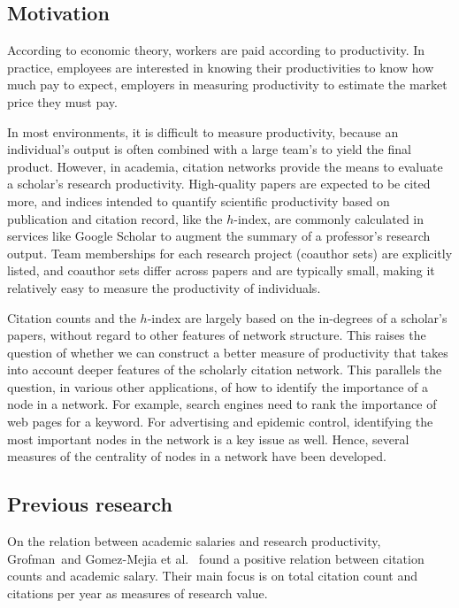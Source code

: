 \subsection{Motivation}
According to economic theory, workers are paid according to productivity. In practice, employees are interested in knowing their productivities to know how much pay to expect, employers in measuring productivity to estimate the market price they must pay.

In most environments, it is difficult to measure productivity, because an individual\textquoteright{}s output is often combined with a large team\textquoteright{}s to yield the final product. However, in academia, citation networks provide the means to evaluate a scholar\textquoteright{}s research productivity. High-quality papers are expected to be cited more, and indices intended to quantify scientific productivity based on publication and citation record, like the $h$-index, are commonly calculated in services like Google Scholar to augment the summary of a professor\textquoteright{}s research output. Team memberships for each research project (coauthor sets) are explicitly listed, and coauthor sets differ across papers and are typically small, making it relatively easy to measure the productivity of individuals.

Citation counts and the $h$-index are largely based on the in-degrees of a scholar\textquoteright{}s papers, without regard to other features of network structure. This raises the question of whether we can construct a better measure of productivity that takes into account deeper features of the scholarly citation network. This parallels the question, in various other applications, of how to identify the importance of a node in a network. For example, search engines need to rank the importance of web pages for a keyword. For advertising and epidemic control, identifying the most important nodes in the network is a key issue as well. Hence, several measures of the centrality of nodes in a network have been developed.

\subsection{Previous research}
On the relation between academic salaries and research productivity, Grofman~\cite{grofman2009political}and Gomez-Mejia et al.~\cite{gomez1992} found a positive relation between citation counts and academic salary. Their main focus is on total citation count and citations per year as measures of research value.

